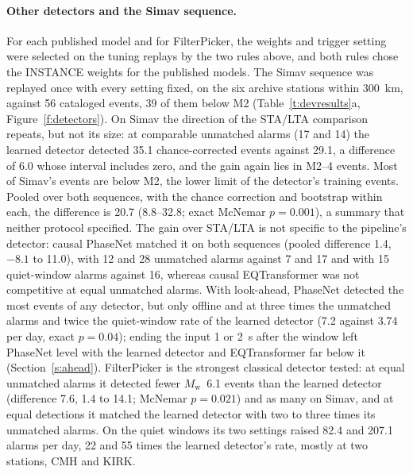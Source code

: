 \documentclass[11pt,a4paper]{article}
\newcommand{\Mw}{$M_\mathrm{w}$}
\newcommand{\stalta}{STA/LTA}
\begin{document}
\paragraph{Other detectors and the Simav sequence.} For each published model and for
FilterPicker, the weights and trigger setting were selected on the tuning replays by
the two rules above, and both rules chose the INSTANCE weights for the published
models. The Simav sequence was replayed once with every setting fixed, on the six
archive stations within 300~km, against 56 cataloged events, 39 of them below M2
(Table~\ref{t:devresults}a, Figure~\ref{f:detectors}). On Simav the direction of the
\stalta{} comparison repeats, but not its size: at comparable unmatched alarms (17 and
14) the learned detector detected 35.1 chance-corrected events against 29.1, a
difference of 6.0 whose interval includes zero, and the gain again lies in M2--4
events. Most of Simav's events are below M2, the lower limit of the detector's training
events. Pooled over both sequences, with the chance correction and bootstrap within
each, the difference is 20.7 (8.8--32.8; exact McNemar $p = 0.001$), a summary that
neither protocol specified. The gain over \stalta{} is not specific to the pipeline's
detector: causal PhaseNet matched it on both sequences (pooled difference 1.4, $-8.1$
to 11.0), with 12 and 28 unmatched alarms against 7 and 17 and with 15 quiet-window
alarms against 16, whereas causal EQTransformer was not competitive at equal unmatched
alarms. With look-ahead, PhaseNet detected the most events of any detector, but only
offline and at three times the unmatched alarms and twice the quiet-window rate of the
learned detector (7.2 against 3.74 per day, exact $p = 0.04$); ending the input 1 or
2~s after the window left PhaseNet level with the learned detector and EQTransformer far
below it (Section~\ref{s:ahead}). FilterPicker is the strongest classical detector
tested: at equal unmatched alarms it detected fewer \Mw{}~6.1 events than the learned
detector (difference 7.6, 1.4 to 14.1; McNemar $p = 0.021$) and as many on Simav, and
at equal detections it matched the learned detector with two to three times its
unmatched alarms. On the quiet windows its two settings raised 82.4 and 207.1 alarms
per day, 22 and 55 times the learned detector's rate, mostly at two stations, CMH and
KIRK.
\end{document}
